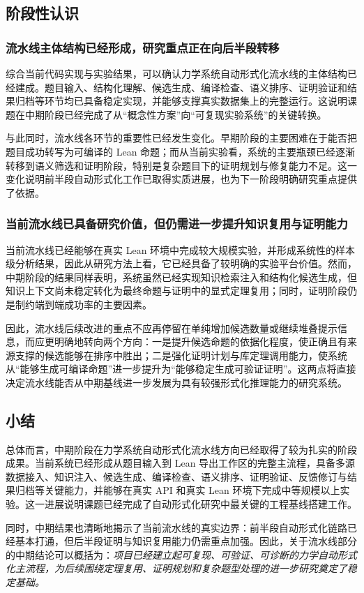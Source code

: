 \documentclass[12pt,a4paper]{ctexart}
\begin{document}
\subsection{阶段性认识}

\subsubsection{流水线主体结构已经形成，研究重点正在向后半段转移}

综合当前代码实现与实验结果，可以确认力学系统自动形式化流水线的主体结构已经建成。题目输入、结构化理解、候选生成、编译检查、语义排序、证明验证和结果归档等环节均已具备稳定实现，并能够支撑真实数据集上的完整运行。这说明课题在中期阶段已经完成了从“概念性方案”向“可复现实验系统”的关键转换。

与此同时，流水线各环节的重要性已经发生变化。早期阶段的主要困难在于能否把题目成功转写为可编译的 Lean 命题；而从当前实验看，系统的主要瓶颈已经逐渐转移到语义筛选和证明阶段，特别是复杂题目下的证明规划与修复能力不足。这一变化说明前半段自动形式化工作已取得实质进展，也为下一阶段明确研究重点提供了依据。

\subsubsection{当前流水线已具备研究价值，但仍需进一步提升知识复用与证明能力}

当前流水线已经能够在真实 Lean 环境中完成较大规模实验，并形成系统性的样本级分析结果，因此从研究方法上看，它已经具备了较明确的实验平台价值。然而，中期阶段的结果同样表明，系统虽然已经实现知识检索注入和结构化候选生成，但知识上下文尚未稳定转化为最终命题与证明中的显式定理复用；同时，证明阶段仍是制约端到端成功率的主要因素。

因此，流水线后续改进的重点不应再停留在单纯增加候选数量或继续堆叠提示信息，而应更明确地转向两个方向：一是提升候选命题的依据化程度，使正确且有来源支撑的候选能够在排序中胜出；二是强化证明计划与库定理调用能力，使系统从“能够生成可编译命题”进一步提升为“能够稳定生成可验证证明”。这两点将直接决定流水线能否从中期基线进一步发展为具有较强形式化推理能力的研究系统。

\subsection{小结}

总体而言，中期阶段在力学系统自动形式化流水线方向已经取得了较为扎实的阶段成果。当前系统已经形成从题目输入到 Lean 导出工作区的完整主流程，具备多源数据接入、知识注入、候选生成、编译检查、语义排序、证明验证、反馈修订与结果归档等关键能力，并能够在真实 API 和真实 Lean 环境下完成中等规模以上实验。这一进展说明课题已经完成了自动形式化研究中最关键的工程基线搭建工作。

同时，中期结果也清晰地揭示了当前流水线的真实边界：前半段自动形式化链路已经基本打通，但后半段证明与知识复用能力仍需重点加强。因此，关于流水线部分的中期结论可以概括为：\emph{项目已经建立起可复现、可验证、可诊断的力学自动形式化主流程，为后续围绕定理复用、证明规划和复杂题型处理的进一步研究奠定了稳定基础。}
\end{document}
